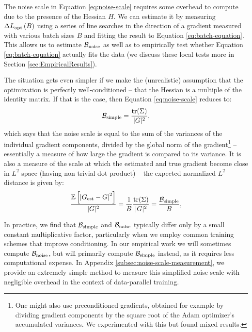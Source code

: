 \documentclass[english]{article}
\begin{document}
The noise scale in Equation \ref{eq:noise-scale} requires some overhead to compute due to the presence of the Hessian $H$. We can estimate it by measuring $\Delta L_{{\rm opt}}\left(B\right)$ using a series of line searches in the direction of a gradient measured with various batch sizes $B$ and fitting the result to Equation \ref{eq:batch-equation}. This allows us to estimate $\mathcal{B}_{{\rm noise}}$ as well as to empirically test whether Equation \ref{eq:batch-equation} actually fits the data (we discuss these local tests more in Section \ref{sec:EmpiricalResults}).

The situation gets even simpler if we make the (unrealistic) assumption that the optimization is perfectly well-conditioned -- that the Hessian is a multiple of the identity matrix. If that is the case, then Equation \ref{eq:noise-scale} reduces to:
\begin{equation}
\mathcal{B}_{{\rm simple}}=\frac{{\rm tr}(\Sigma)}{|G|^{2}},\label{eq:SimplestNoiseScale}
\end{equation}
which says that the noise scale is equal to the sum of the variances of the individual gradient components, divided by the global norm of the gradient\footnote{One might also use preconditioned gradients, obtained for example by dividing  gradient components by the square root of the Adam optimizer's \cite{kingma2014adam} accumulated variances.  We  experimented with this but found mixed results.} -- essentially a measure of how large the gradient is compared to its variance. It is also a measure of the scale at which the estimated and true gradient become close in $L^{2}$ space (having non-trivial dot product) -- the expected normalized $L^{2}$ distance is given by:
\begin{equation}
\frac{\mathbb{E}\left[\left|G_{{\rm est}}-G\right|^{2}\right]}{|G|^{2}}=\frac{1}{B}\frac{{\rm tr}(\Sigma)}{|G|^{2}}=\frac{\mathcal{B}_{{\rm simple}}}{B},
\end{equation}

In practice, we find that $\mathcal{B}_{{\rm simple}}$ and $\mathcal{B}_{{\rm noise}}$ typically differ only by a small constant multiplicative factor, particularly when we employ common training schemes that improve conditioning. In our empirical work we will sometimes compute $\mathcal{B}_{{\rm noise}}$, but will primarily compute $\mathcal{B}_{{\rm simple}}$ instead, as it requires less computational expense.  In Appendix \ref{subsec:noise-scale-measurement}, we provide an extremely simple method to measure this simplified noise scale with negligible overhead in the context of data-parallel training.
\end{document}
